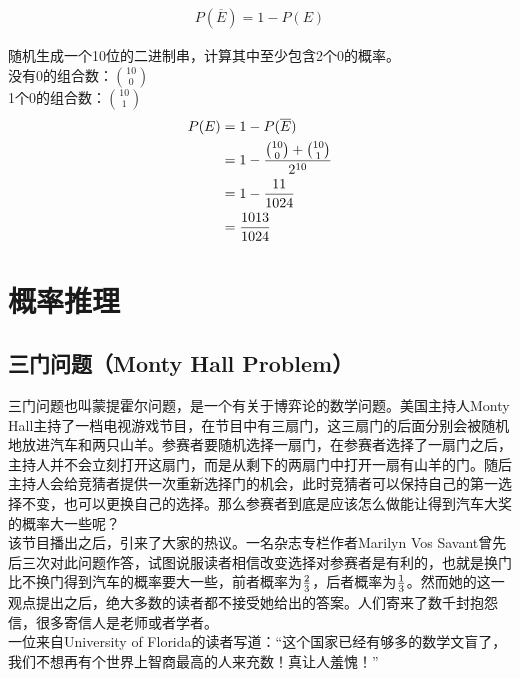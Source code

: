 \vspace{-1cm}

\begin{align}
	P(\overline{E}) = 1 - P(E)
\end{align}

\begin{tcolorbox}
	随机生成一个10位的二进制串，计算其中至少包含2个0的概率。\\
	没有0的组合数：$ 10 \choose 0 $\\
	1个0的组合数：$ 10 \choose 1$
	\begin{align*}
		P(E) & = 1 - P(\overline{{E}})                                \\
		     & = 1 - {{10 \choose 0} + {10 \choose 1} \over {2^{10}}} \\
		     & = 1 - {11 \over 1024}                                  \\
		     & = {1013 \over 1024}
	\end{align*}
\end{tcolorbox}

\newpage

\section{概率推理}

\subsection{三门问题（Monty Hall Problem）}

三门问题也叫蒙提霍尔问题，是一个有关于博弈论的数学问题。美国主持人Monty Hall主持了一档电视游戏节目，在节目中有三扇门，这三扇门的后面分别会被随机地放进汽车和两只山羊。参赛者要随机选择一扇门，在参赛者选择了一扇门之后，主持人并不会立刻打开这扇门，而是从剩下的两扇门中打开一扇有山羊的门。随后主持人会给竞猜者提供一次重新选择门的机会，此时竞猜者可以保持自己的第一选择不变，也可以更换自己的选择。那么参赛者到底是应该怎么做能让得到汽车大奖的概率大一些呢？\\

该节目播出之后，引来了大家的热议。一名杂志专栏作者Marilyn Vos Savant曾先后三次对此问题作答，试图说服读者相信改变选择对参赛者是有利的，也就是换门比不换门得到汽车的概率要大一些，前者概率为$ 2 \over 3 $，后者概率为$ 1 \over 3 $。然而她的这一观点提出之后，绝大多数的读者都不接受她给出的答案。人们寄来了数千封抱怨信，很多寄信人是老师或者学者。\\

一位来自University of Florida的读者写道：“这个国家已经有够多的数学文盲了，我们不想再有个世界上智商最高的人来充数！真让人羞愧！”\\

